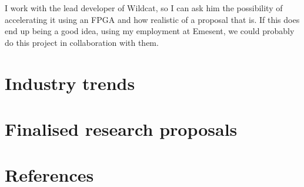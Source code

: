 \documentclass[12pt]{article}
\begin{document}

I work with the lead developer of Wildcat, so I can ask him the possibility of accelerating it using an FPGA
and how realistic of a proposal that is. If this does end up being a good idea, using my employment at
Emesent, we could probably do this project in collaboration with them.

%

\section{Industry trends}

\section{Finalised research proposals}

\section{References}
\printbibliography[heading=none]
\end{document}
